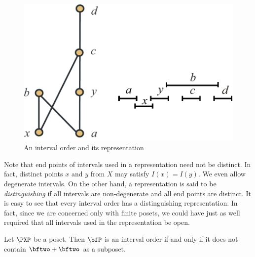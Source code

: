 \begin{figure}
\begin{center}
\includegraphics*[scale=.4]{posets-figs/wttfig-11}
\caption{An interval order and its representation}
\label{fig:intervalorder} 
\end{center}
\end{figure}

Note that end points of intervals used in a representation
need not be distinct.  In fact, distinct points $x$ and $y$ from
$X$ may satisfy $I(x)=I(y)$.  We even allow degenerate intervals.
On the other hand, a representation is said to be
\textit{distinguishing} if all intervals are non-degenerate and
all end points are distinct. It is easy to see that every interval
order has a distinguishing representation. In fact, since we are
concerned only with finite posets, we could have just as well
required that all intervals used in the representation be open.

\begin{theorem}[Fishburn]\label{thm:fishburn}
Let $\PXP$ be a poset.  Then $\bfP$ is an interval order if 
and only if it does not contain $\bftwo+\bftwo$ as a subposet.
\end{theorem}

